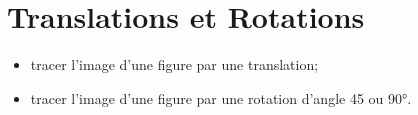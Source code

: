 \chapter{Translations et Rotations}\label{ChTranslationsRotations}

\vspace{5cm}

\begin{acquis}
\begin{itemize}
\item tracer l’image d’une  figure par une translation;
\columnbreak
\item tracer l'image d'une figure par une rotation d'angle 45 ou 90°.
\end{itemize}
\end{acquis}


\activites



\cours


\exercicesbase
\begin{colonne*exercice}

\end{colonne*exercice}


\exercicesappr
\begin{colonne*exercice}

\end{colonne*exercice}

\connaissances


\TravauxPratiques %


\pagebreak

\recreation



